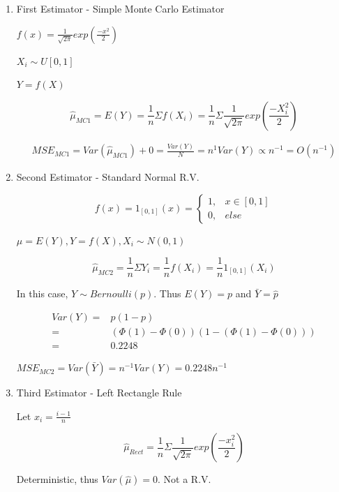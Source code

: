 \documentclass[11pt]{article}
\begin{document}
\begin{enumerate}
\item First Estimator - Simple Monte Carlo Estimator
\label{sec:orgb18a119}

\(f(x) = \frac{1}{\sqrt{2 \pi}} exp(\frac{-x^2}{2})\)

\(X_i \sim U[0,1]\)

\(Y = f(X)\)

$$
\hat \mu_{MC1} = E(Y) = \frac{1}{n} \Sigma f(X_i) = \frac{1}{n} \Sigma
\frac{1}{\sqrt{2 \pi}} exp(\frac{- X_i^2}{2})
$$


\begin{equation}
\begin{split}
MSE_{MC1} = Var(\hat \mu_{MC1}) + 0 = \frac{Var(Y)}{N} = n^{1} Var(Y) \propto n^{-1} = O(n^{-1})
\end{split}
\end{equation}
\item Second Estimator - Standard Normal R.V.
\label{sec:orgb649d66}

$$
f(x) = 1_{[0,1]}(x) = \begin{cases}
1, & x \in [0,1]\\
0, & else
\end{cases}
$$

\(\mu = E(Y), Y = f(X), X_i \sim N(0,1)\)


$$
\hat \mu_{MC2} = \frac{1}{n} \Sigma Y_i = \frac{1}{n} f(X_i) = \frac{1}{n} 1_{[0,1]}(X_i)
$$

In this case, \(Y \sim Bernoulli(p)\). Thus \(E(Y) = p\) and \(\bar Y = \hat p\)


\begin{equation}
\begin{split}
Var(Y) = & p(1 - p)\\
= & (\Phi(1) - \Phi(0))(1 - (\Phi(1) - \Phi(0)))\\
= & 0.2248
\end{split}
\end{equation}

\(MSE_{MC2} = Var(\bar Y) = n^{-1} Var(Y) = 0.2248 n^{-1}\)

\item Third Estimator - Left Rectangle Rule
\label{sec:org437fe57}

Let \(x_i = \frac{i - 1}{n}\)


$$
\hat \mu_{Rect} = \frac{1}{n} \Sigma \frac{1}{\sqrt{2 \pi}} exp(\frac{-x_i^2}{2})
$$

Deterministic, thus \(Var(\hat \mu) = 0\). Not a R.V.


\end{enumerate}
\end{document}
